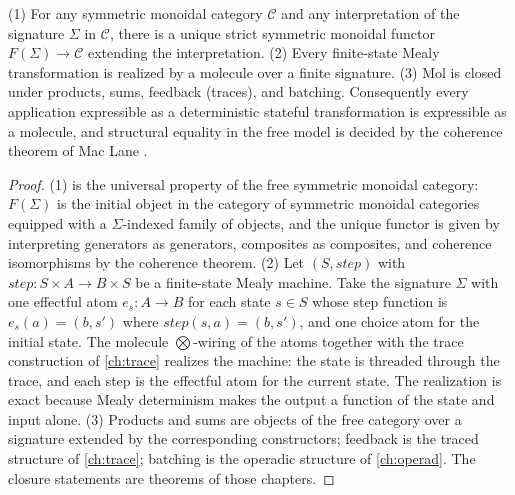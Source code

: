 \begin{theorem}\label{thm:universality}
(1) For any symmetric monoidal category $\mathcal{C}$ and any
interpretation of the signature $\Sigma$ in $\mathcal{C}$, there is a
unique strict symmetric monoidal functor
$F(\Sigma) \to \mathcal{C}$ extending the interpretation.
(2) Every finite-state Mealy transformation is realized by a molecule
over a finite signature. (3) Mol is closed under products, sums,
feedback (traces), and batching. Consequently every application
expressible as a deterministic stateful transformation is expressible
as a molecule, and structural equality in the free model is decided by
the coherence theorem of Mac Lane \citep{maclane}.
\end{theorem}

\begin{proof}
(1) is the universal property of the free symmetric monoidal category:
$F(\Sigma)$ is the initial object in the category of symmetric
monoidal categories equipped with a $\Sigma$-indexed family of
objects, and the unique functor is given by interpreting generators as
generators, composites as composites, and coherence isomorphisms by
the coherence theorem. (2) Let $(S, \mathit{step})$ with
$\mathit{step} : S \times A \to B \times S$ be a finite-state Mealy
machine. Take the signature $\Sigma$ with one effectful atom
$e_s : A \to B$ for each state $s \in S$ whose step function is
$e_s(a) = (b, s')$ where $\mathit{step}(s, a) = (b, s')$, and one
choice atom for the initial state. The molecule $\bigotimes$-wiring of
the atoms together with the trace construction of
\autoref{ch:trace} realizes the machine: the state is threaded through
the trace, and each step is the effectful atom for the current state.
The realization is exact because Mealy determinism makes the output a
function of the state and input alone. (3) Products and sums are
objects of the free category over a signature extended by the
corresponding constructors; feedback is the traced structure of
\autoref{ch:trace}; batching is the operadic structure of
\autoref{ch:operad}. The closure statements are theorems of those
chapters.
\end{proof}

